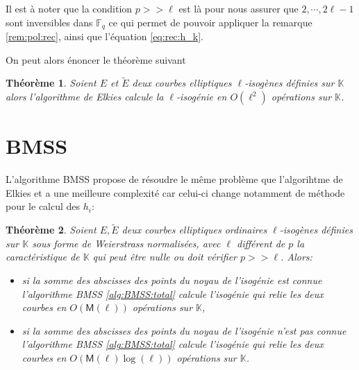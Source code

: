 \documentclass[10pt,a4paper]{book}
\theoremstyle{plain}
\newtheorem{thm}{Théorème}
\theoremstyle{definition}
\theoremstyle{definition}
\theoremstyle{definition}
\theoremstyle{definition}
\theoremstyle{remark}
\theoremstyle{remark}
\begin{document}
Il est à noter que la condition $p >> \ell$ est là pour nous assurer que $2, \cdots, 2\ell-1$ sont inversibles dans $\mathbb{F}_q$ ce qui permet de pouvoir appliquer la remarque \ref{rem:pol:rec}, ainsi que l'équation \eqref{eq:rec:h_k}.

On peut alors énoncer le théorème suivant
\begin{thm}
Soient $E$ et $\tilde{E}$ deux courbes elliptiques $\ell$-isogènes définies sur $\mathbb{K}$ alors l'algorithme de Elkies calcule la $\ell$-isogénie en $O(\ell^2)$ opérations sur $\mathbb{K}$.
\end{thm}
 
\section{BMSS}
L'algorithme BMSS \cite{BMSS08} propose de résoudre le même problème que l'algorihtme de Elkies \cite{elkies1998} et a une meilleure complexité car celui-ci change notamment de méthode pour le calcul des $h_i$:
\begin{thm}
\label{thm:BMSS}
Soient $E, \tilde{E}$ deux courbes elliptiques ordinaires $\ell$-isogènes définies sur $\mathbb{K}$ sous forme de Weierstrass normalisées, avec $\ell$ différent de $p$ la caractéristique de $\mathbb{K}$ qui peut être nulle ou doit vérifier $p >> \ell$. Alors:
\begin{itemize}
\item  si la somme des abscisses des points du noyau de l'isogénie est connue l'algorithme BMSS \ref{alg:BMSS:total} calcule l'isogénie qui relie les deux courbes en $O(\mathsf{M}(\ell))$ opérations sur $\mathbb{K}$,
\item si la somme des abscisses des points du noyau de l'isogénie n'est pas connue l'algorithme BMSS \ref{alg:BMSS:total} calcule l'isogénie qui relie les deux courbes en $O(\mathsf{M}(\ell)\log(\ell))$ opérations sur $\mathbb{K}$.
\end{itemize}
\end{thm}
\end{document}

